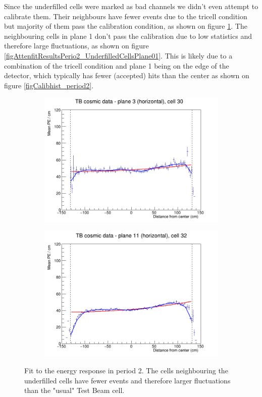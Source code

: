 \documentclass[12pt,a4paper]{article}
\begin{document}
Since the underfilled cells were marked as bad channels we didn't even attempt to calibrate them. Their neighbours have fewer events due to the tricell condition but majority of them pass the calibration condition, as shown on figure \ref{figAttenfitResultsPerio2_UnderfilledCells}. The neighbouring cells in plane 1 don't pass the calibration due to low statistics and therefore large fluctuations, as shown on figure \ref{figAttenfitResultsPerio2_UnderfilledCellsPlane01}. This is likely due to a combination of the tricell condition and plane 1 being on the edge of the detector, which typically has fewer (accepted) hits than the center as shown on figure \ref{figCalibhist_period2}.

\begin{figure}[h]
  \begin{subfigure}{0.5\textwidth}
    \includegraphics[width=\linewidth]{RelativeCalibrationResults/p2_003_030.png}
  \end{subfigure}
  \begin{subfigure}{0.5\textwidth}
    \includegraphics[width=\linewidth]{RelativeCalibrationResults/p2_011_032.png}
  \end{subfigure}
  \caption{Fit to the energy response in period 2. The cells neighbouring the underfilled cells have fewer events and therefore larger fluctuations than the "usual" Test Beam cell.}
  \label{figAttenfitResultsPerio2_UnderfilledCells}
\end{figure}
\end{document}
